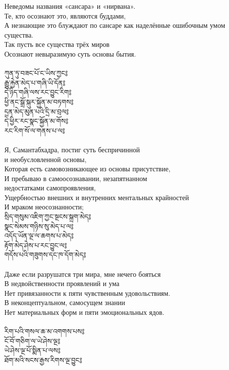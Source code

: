 Неведомы названия «сансара» и «нирвана».\\
Те, кто осознают это, являются буддами,\\
А незнающие это блуждают по сансаре как наделённые ошибочным умом существа. \\
Так пусть все существа трёх миров\\
Осознают невыразимую суть основы бытия.\\
\\
{\ti
ཀུན་ཏུ་བཟང་པོ་ང་ཡིས་ཀྱང༔ \\
རྒྱུ་རྐྱེན་མེད་པ་གཞི་ཡི་དོན༔ \\
དེ་ཉིད་གཞི་ལས་རང་བྱུང་རིག༔ \\
ཕྱི་ནང་སྒྲོ་སྐུར་སྐྱོན་མ་བཏགས༔ \\
དྲན་མེད་མུན་པའི་དྲི་མ་བྲལ༔ \\
དེ་ཕྱིར་རང་སྣང་སྐྱོན་མ་གོས༔ \\
རང་རིག་སོ་ལ་གནས་པ་ལ༔}\\
\\
Я, Самантабхадра, постиг суть беспричинной \\
и необусловленной основы, \\
Которая есть самовозникающее из основы присутствие, \\
И пребываю в самоосознавании, незапятнанном \\
недостатками самопроявления, \\
Ущербностью внешних и внутренних ментальных крайностей \\
И мраком неосознанности;
\\
\newpage
{\ti
སྲིད་གསུམ་འཇིག་ཀྱང་སྔངས་སྐྲག་མེད༔\\
སྣང་སེམས་གཉིས་སུ་མེད་པ་ལ༔\\
འདོད་ཡོན་ལྔ་ལ་ཆགས་པ་མེད༔\\
རྟོག་མེད་ཤེས་པ་རང་བྱུང་ལ༔\\
གདོས་པའི་གཟུགས་དང་ཁ་དོག་མེད༔}\\
\\
Даже если разрушатся три мира, мне нечего бояться \\
В недвойственности проявлений и ума \\
Нет привязанности к пяти чувственным удовольствиям. \\
В неконцептуальном, самосущем знании \\
Нет материальных форм и пяти эмоциональных ядов.\\
\\
{\ti
རིག་པའི་གསལ་ཆ་མ་འགགས་པས༔ \\
ངོ་བོ་གཅིག་ལ་ཡེ་ཤེས་ལྔ༔ \\
ཡེ་ཤེས་ལྔ་པོ་སྨིན་པ་ལས༔ \\
ཐོག་མའི་སངས་རྒྱས་རིགས་ལྔ་བྱུང༔}\\
